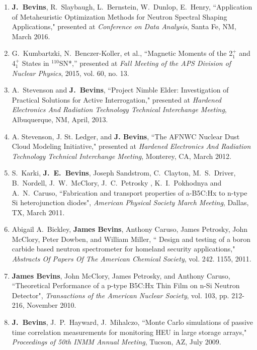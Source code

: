 \begin{enumerate}
  \item \textbf{J.\ Bevins}, R.\ Slaybaugh, L.\ Bernstein, W.\ Dunlop, E.\ Henry, ``Application of Metaheuristic Optimization Methods for Neutron Spectral Shaping Applications," presented at \textit{Conference on Data Analysis}, Santa Fe, NM, March 2016.
  
  \item G.\ Kumbartzki, N.\ Benczer-Koller, et al., ``Magnetic Moments of the 2$^+_1$ and 4$^+_1$ States in $^{110}$SN*,” presented at \textit{Fall Meeting of the APS Division of Nuclear Physics}, 2015, vol. 60, no. 13.
  
  \item A.\ Stevenson and \textbf{J.\ Bevins}, ``Project Nimble Elder: Investigation of Practical Solutions for Active Interrogation," presented at \textit{Hardened Electronics And Radiation Technology Technical Interchange Meeting}, Albuquerque, NM, April, 2013.
  
  \item A. Stevenson, J. St. Ledger, and \textbf{J. Bevins}, ``The AFNWC Nuclear Dust Cloud Modeling Initiative," presented at \textit{Hardened Electronics And Radiation Technology Technical Interchange Meeting}, Monterey, CA, March 2012.

  \item S.\ Karki, \textbf{J.\ E.\ Bevins}, Joseph Sandstrom, C.\ Clayton, M.\ S.\ Driver, B.\ Nordell, J.\ W.\ McClory, J.\ C.\ Petrosky , K.\ I.\ Pokhodnya and A.\ N.\ Caruso, ``Fabrication and transport properties of a-B5C:Hx to n-type Si heterojunction diodes", \textit{American Physical Society March Meeting}, Dallas, TX, March 2011. 
  
  \item Abigail A.\ Bickley, \textbf{James Bevins}, Anthony Caruso, James Petrosky, John McClory, Peter Dowben, and William Miller, `` Design and testing of a boron carbide based neutron spectrometer for homeland security applications," \textit{Abstracts Of Papers Of The American Chemical Society}, vol. 242. 1155, 2011.

  \item \textbf{James Bevins}, John McClory, James Petrosky, and Anthony Caruso, ``Theoretical Performance of a p-type B5C:Hx Thin Film on n-Si Neutron Detector", \textit{Transactions of the American Nuclear Society}, vol. 103, pp. 212-216, November 2010. 
  
  \item \textbf{J.\ Bevins}, J.\ P.\ Hayward, J.\ Mihalczo, ``Monte Carlo simulations of passive time correlation measurements for monitoring HEU in large storage arrays," \textit{Proceedings of 50th INMM Annual Meeting}, Tucson, AZ, July 2009.
\end{enumerate}

